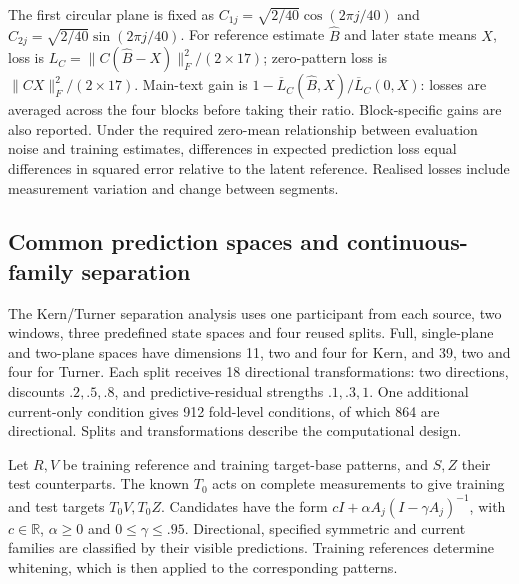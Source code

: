 \documentclass[11pt,a4paper]{article}
\begin{document}
The first circular plane is fixed as
\(C_{1j}=\sqrt{2/40}\cos(2\pi j/40)\) and
\(C_{2j}=\sqrt{2/40}\sin(2\pi j/40)\). For reference estimate
\(\widehat B\) and later state means \(X\), loss is
\(L_C=\|C(\widehat B-X)\|_F^2/(2\times17)\); zero-pattern loss is
\(\|CX\|_F^2/(2\times17)\). Main-text gain is
\(1-\overline L_C(\widehat B,X)/\overline L_C(0,X)\): losses are
averaged across the four blocks before taking their ratio.
Block-specific gains are also reported. Under the required zero-mean
relationship between evaluation noise and training estimates,
differences in expected prediction loss equal differences in squared
error relative to the latent reference. Realised losses include
measurement variation and change between segments.

\subsection{Common prediction spaces and continuous-family
separation}\label{common-prediction-spaces-and-continuous-family-separation}

The Kern/Turner separation analysis uses one participant from each
source, two windows, three predefined state spaces and four reused
splits. Full, single-plane and two-plane spaces have dimensions 11, two
and four for Kern, and 39, two and four for Turner. Each split receives
18 directional transformations: two directions, discounts \(.2,.5,.8\),
and predictive-residual strengths \(.1,.3,1\). One additional
current-only condition gives 912 fold-level conditions, of which 864 are
directional. Splits and transformations describe the computational
design.

Let \(R,V\) be training reference and training target-base patterns, and
\(S,Z\) their test counterparts. The known \(T_0\) acts on complete
measurements to give training and test targets \(T_0V,T_0Z\). Candidates
have the form \(cI+\alpha A_j(I-\gamma A_j)^{-1}\), with
\(c\in\mathbb R\), \(\alpha\geq0\) and \(0\leq\gamma\leq.95\).
Directional, specified symmetric and current families are classified by
their visible predictions. Training references determine whitening,
which is then applied to the corresponding patterns.
\end{document}
